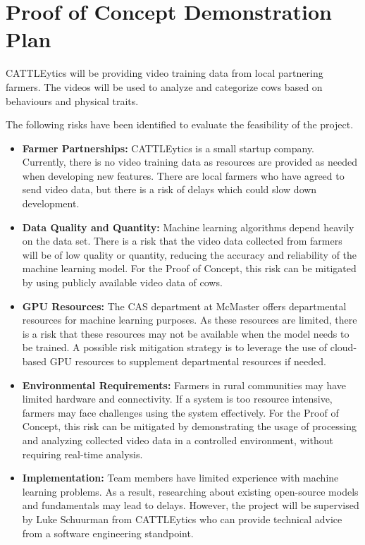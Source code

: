 \documentclass{article}
\begin{document}
\section{Proof of Concept Demonstration Plan}

CATTLEytics will be providing video training data from local partnering farmers. The videos will be used to analyze and categorize cows based on behaviours and physical traits.  

\vspace{1em}

\noindent The following risks have been identified to evaluate the feasibility of the project. 

\vspace{1em}

\begin{itemize}
  \item \noindent \textbf{Farmer Partnerships:} CATTLEytics is a small startup company. Currently, there is no video training data as resources are provided as needed when developing new features. There are local farmers who have agreed to send video data, but there is a risk of delays which could slow down development. 
  \item \noindent \textbf{Data Quality and Quantity:} Machine learning algorithms depend heavily on the data set. There is a risk that the video data collected from farmers will be of low quality or quantity, reducing the accuracy and reliability of the machine learning model. For the Proof of Concept, this risk can be mitigated by using publicly available video data of cows. 
  \item \noindent \textbf{GPU Resources:} The CAS department at McMaster offers departmental resources for machine learning purposes. As these resources are limited, there is a risk that these resources may not be available when the model needs to be trained. A possible risk mitigation strategy is to leverage the use of cloud-based GPU resources to supplement departmental resources if needed.
  \item \noindent \textbf{Environmental Requirements:} Farmers in rural communities may have limited hardware and connectivity. If a system is too resource intensive, farmers may face challenges using the system effectively. For the Proof of Concept, this risk can be mitigated by demonstrating the usage of processing and analyzing collected video data in a controlled environment, without requiring real-time analysis. 
  \item \noindent \textbf{Implementation:} Team members have limited experience with machine learning problems. As a result, researching about existing open-source models and fundamentals may lead to delays. However, the project will be supervised by Luke Schuurman from CATTLEytics who can provide technical advice from a software engineering standpoint. 

\end{itemize}
\end{document}
